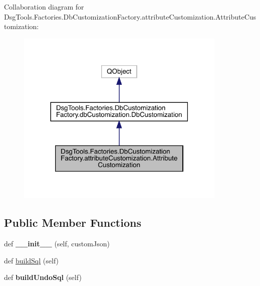 Collaboration diagram for Dsg\+Tools.\+Factories.\+Db\+Customization\+Factory.\+attribute\+Customization.\+Attribute\+Customization\+:
\nopagebreak
\begin{figure}[H]
\begin{center}
\leavevmode
\includegraphics[width=285pt]{class_dsg_tools_1_1_factories_1_1_db_customization_factory_1_1attribute_customization_1_1_attribute_customization__coll__graph}
\end{center}
\end{figure}
\subsection*{Public Member Functions}
\begin{DoxyCompactItemize}
\item 
\mbox{\label{class_dsg_tools_1_1_factories_1_1_db_customization_factory_1_1attribute_customization_1_1_attribute_customization_aba855af9f9a71e736982fd13e91bac15}} 
def {\bfseries \+\_\+\+\_\+init\+\_\+\+\_\+} (self, custom\+Json)
\item 
def \mbox{\hyperlink{class_dsg_tools_1_1_factories_1_1_db_customization_factory_1_1attribute_customization_1_1_attribute_customization_ab08ae1a29546b5a86e55ca956efd3f48}{build\+Sql}} (self)
\item 
\mbox{\label{class_dsg_tools_1_1_factories_1_1_db_customization_factory_1_1attribute_customization_1_1_attribute_customization_af59696d5b83392d41d97272251d7590f}} 
def {\bfseries build\+Undo\+Sql} (self)
\end{DoxyCompactItemize}
